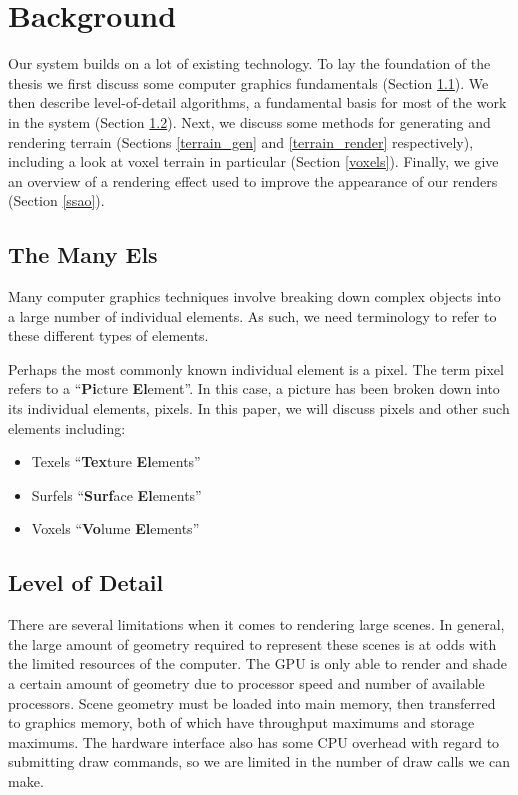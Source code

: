 \chapter{Background} \label{bgrnd}

Our system builds on a lot of existing technology.
To lay the foundation of the thesis we first discuss some computer graphics fundamentals (Section \ref{els}).
We then describe level-of-detail algorithms, a fundamental basis for most of the work in the system (Section \ref{lod}).
Next, we discuss some methods for generating and rendering terrain (Sections \ref{terrain_gen} and \ref{terrain_render} respectively), including a look at voxel terrain in particular (Section \ref{voxels}).
Finally, we give an overview of a rendering effect used to improve the appearance of our renders (Section \ref{ssao}).


\section{The Many Els} \label{els}

Many computer graphics techniques involve breaking down complex objects into a large number of individual elements.
As such, we need terminology to refer to these different types of elements.

Perhaps the most commonly known individual element is a pixel.
The term pixel refers to a ``\textbf{Pi}cture \textbf{El}ement''.
In this case, a picture has been broken down into its individual elements, pixels.
In this paper, we will discuss pixels and other such elements including:

\begin{itemize}
	\item Texels ``\textbf{Tex}ture \textbf{El}ements''
	\item Surfels ``\textbf{Surf}ace \textbf{El}ements''
	\item Voxels ``\textbf{Vo}lume \textbf{El}ements''
\end{itemize}


\section{Level of Detail} \label{lod}

There are several limitations when it comes to rendering large scenes.
In general, the large amount of geometry required to represent these scenes is at odds with the limited resources of the computer.
The GPU is only able to render and shade a certain amount of geometry due to processor speed and number of available processors.
Scene geometry must be loaded into main memory, then transferred to graphics memory, both of which have throughput maximums and storage maximums.
The hardware interface also has some CPU overhead with regard to submitting draw commands, so we are limited in the number of draw calls we can make.

